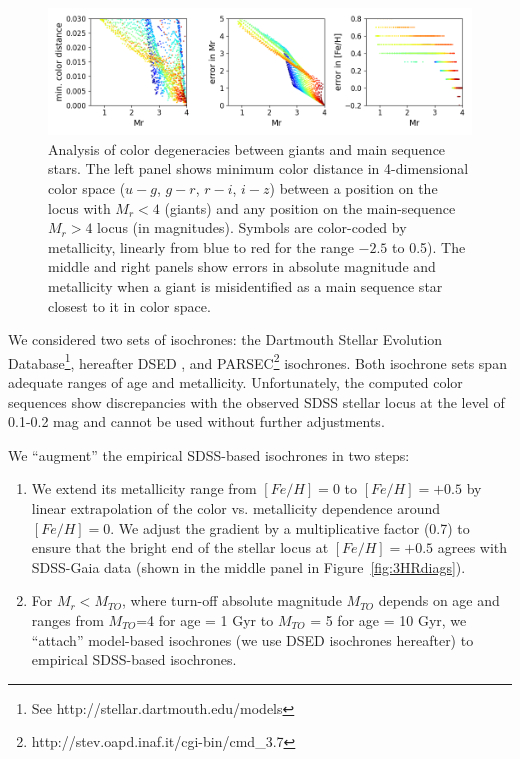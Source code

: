\begin{figure}[ht!]
\includegraphics[width=1.0\textwidth,angle=0]{figures/RGdegeneracy.png}
\caption{Analysis of color degeneracies between giants and main  sequence stars. The left panel shows minimum color distance in
  4-dimensional color space ($u-g$, $g-r$, $r-i$, $i-z$) between a position on the locus with $M_r<4$ (giants) and any position on the
  main-sequence $M_r>4$ locus (in magnitudes). Symbols are color-coded by metallicity, linearly from blue to red for the range $-2.5$ to 0.5).
  The middle and right panels show errors in absolute magnitude and metallicity when a giant is misidentified as a main sequence star
  closest to it in color space.} 
\label{fig:RGdegeneracy}
\end{figure}

We considered two sets of isochrones: the Dartmouth Stellar Evolution Database\footnote{See http://stellar.dartmouth.edu/models},
hereafter DSED \citep{2008ApJS..178...89D}, and PARSEC\footnote{http://stev.oapd.inaf.it/cgi-bin/cmd\_3.7} \citep{2012MNRAS.427..127B} isochrones. 
Both isochrone sets span adequate ranges of age and metallicity. Unfortunately, the computed color sequences show discrepancies
with the observed SDSS stellar locus at the level of 0.1-0.2 mag and cannot be used without further adjustments.

We ``augment'' the empirical SDSS-based isochrones in two steps:
\begin{enumerate}
\item We extend its metallicity range from $[Fe/H]=0$ to $[Fe/H]=+0.5$ by linear extrapolation of the color vs. metallicity
  dependence around $[Fe/H]=0$. We adjust the gradient by a multiplicative factor (0.7) to ensure that the bright end of the
  stellar locus at $[Fe/H]=+0.5$ agrees with SDSS-Gaia data (shown in the middle panel in Figure~\ref{fig:3HRdiags}).
\item 
  For $M_r < M_{TO}$, where turn-off absolute magnitude $M_{TO}$ depends on age and ranges from $M_{TO}$=4 for age = 1 Gyr
  to $M_{TO}$ = 5 for age = 10 Gyr, we ``attach'' model-based isochrones (we use DSED isochrones hereafter) to empirical
  SDSS-based isochrones.
\end{enumerate}

